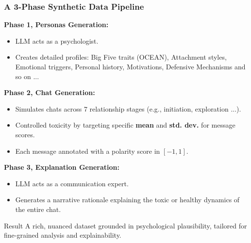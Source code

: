 \documentclass[aspectratio=169]{beamer}
\begin{document}

\begin{frame}
    \frametitle{A 3-Phase Synthetic Data Pipeline}
    \textbf{Phase 1, Personas Generation:}
    \begin{itemize}
        \item LLM acts as a psychologist.
        \item Creates detailed profiles: Big Five traits (OCEAN), Attachment styles, Emotional triggers, Personal history, Motivations, Defensive Mechanisms and so on ...
    \end{itemize}
    \pause
    \textbf{Phase 2, Chat Generation:}
    \begin{itemize}
        \item Simulates chats across 7 relationship stages (e.g., initiation, exploration ...).
        \item Controlled toxicity by targeting specific \textbf{mean} and \textbf{std. dev.} for message scores.
        \item Each message annotated with a polarity score in $[-1, 1]$.
    \end{itemize}
    \pause
    \textbf{Phase 3, Explanation Generation:}
    \begin{itemize}
        \item LLM acts as a communication expert.
        \item Generates a narrative rationale explaining the toxic or healthy dynamics of the entire chat.
    \end{itemize}

    \pause
    \begin{alertblock}{Result}
        A rich, nuanced dataset grounded in psychological plausibility, tailored for fine-grained analysis and explainability.
    \end{alertblock}
\end{frame}
\end{document}
